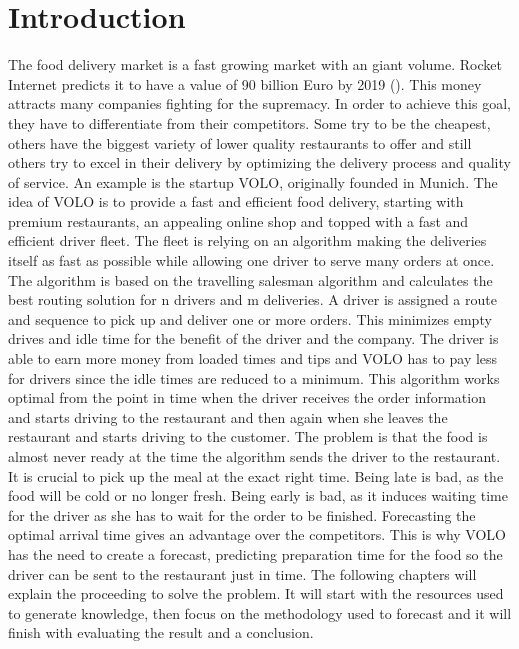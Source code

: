 \chapter{Introduction}\label{chapter:Introduction}

\renewcommand{\thepage}{\arabic{page}}
\setcounter{page}{1}

The food delivery market is a fast growing market with an giant volume. Rocket Internet predicts it to have a value of 90 billion Euro by 2019 (\cite{Rocket}). This money attracts many companies fighting for the supremacy. In order to achieve this goal, they have to differentiate from their competitors. Some try to be the cheapest, others have the biggest variety of lower quality restaurants to offer and still others try to excel in their delivery by optimizing the delivery process and quality of service.\newline
An example is the startup VOLO, originally founded in Munich. The idea of VOLO is to provide a fast and efficient food delivery, starting with premium restaurants, an appealing online shop and topped with a fast and efficient driver fleet. The fleet is relying on an algorithm making the deliveries itself as fast as possible while allowing one driver to serve many orders at once. The algorithm is based on the travelling salesman algorithm and calculates the best routing solution for n drivers and m deliveries. A driver is assigned a route and sequence to pick up and deliver one or more orders. This minimizes empty drives and idle time for the benefit of the driver and the company. The driver is able to earn more money from loaded times and tips and VOLO has to pay less for drivers since the idle times are reduced to a minimum.\newline
This algorithm works optimal from the point in time when the driver receives the order information and starts driving to the restaurant and then again when she leaves the restaurant and starts driving to the customer. The problem is that the food is almost never ready at the time the algorithm sends the driver to the restaurant. It is crucial to pick up the meal at the exact right time. Being late is bad, as the food will be cold or no longer fresh. Being early is bad, as it induces waiting time for the driver as she has to wait for the order to be finished. Forecasting the optimal arrival time gives an advantage over the competitors.\newline
This is why VOLO has the need to create a forecast, predicting preparation time for the food so the driver can be sent to the restaurant just in time.\newline
The following chapters will explain the proceeding to solve the problem. It will start with the resources used to generate knowledge, then focus on the methodology used to forecast and it will finish with evaluating the result and a conclusion.
